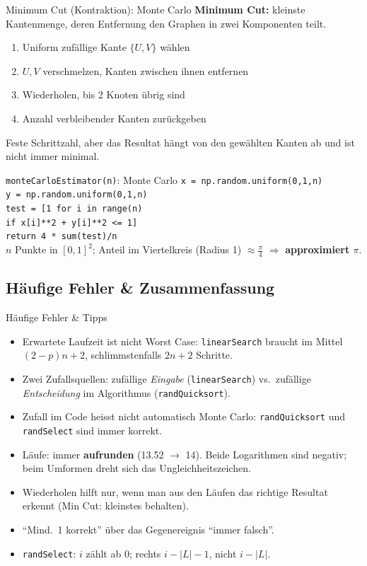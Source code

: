 \documentclass[a4paper, fontsize=7pt]{scrartcl}
\begin{document}
\begin{subbox}{Minimum Cut (Kontraktion): Monte Carlo}
\textbf{Minimum Cut:} kleinste Kantenmenge, deren Entfernung den Graphen in zwei
Komponenten teilt.
\begin{enumerate}
    \item Uniform zufällige Kante $\{U, V\}$ wählen
    \item $U, V$ verschmelzen, Kanten zwischen ihnen entfernen
    \item Wiederholen, bis 2 Knoten übrig sind
    \item Anzahl verbleibender Kanten zurückgeben
\end{enumerate}
Feste Schrittzahl, aber das Resultat hängt von den gewählten Kanten ab und ist nicht
immer minimal.
\end{subbox}

\begin{subbox}{\texttt{monteCarloEstimator(n)}: Monte Carlo}
\texttt{x = np.random.uniform(0,1,n)}\\
\texttt{y = np.random.uniform(0,1,n)}\\
\texttt{test = [1 for i in range(n)}\\
\phantom{xx}\texttt{if x[i]**2 + y[i]**2 <= 1]}\\
\texttt{return 4 * sum(test)/n}\\[2pt]
$n$ Punkte in $[0,1]^2$; Anteil im Viertelkreis (Radius 1) $\approx \frac{\pi}{4}$
$\Rightarrow$ \textbf{approximiert $\pi$}.
\end{subbox}

\subsection{Häufige Fehler \& Zusammenfassung}

\begin{subbox}{Häufige Fehler \& Tipps}
\begin{itemize}
    \item Erwartete Laufzeit ist nicht Worst Case: \texttt{linearSearch} braucht im
          Mittel $(2 - p)n + 2$, schlimmstenfalls $2n + 2$ Schritte.
    \item Zwei Zufallsquellen: zufällige \emph{Eingabe} (\texttt{linearSearch}) vs.\
          zufällige \emph{Entscheidung} im Algorithmus (\texttt{randQuicksort}).
    \item Zufall im Code heisst nicht automatisch Monte Carlo: \texttt{randQuicksort}
          und \texttt{randSelect} sind immer korrekt.
    \item Läufe: immer \textbf{aufrunden} (13.52 $\to$ 14). Beide Logarithmen sind
          negativ; beim Umformen dreht sich das Ungleichheitszeichen.
    \item Wiederholen hilft nur, wenn man aus den Läufen das richtige Resultat erkennt
          (Min Cut: kleinstes behalten).
    \item ``Mind.\ 1 korrekt'' über das Gegenereignis ``immer falsch''.
    \item \texttt{randSelect}: $i$ zählt ab 0; rechts $i - |L| - 1$, nicht $i - |L|$.
\end{itemize}
\end{subbox}
\end{document}
